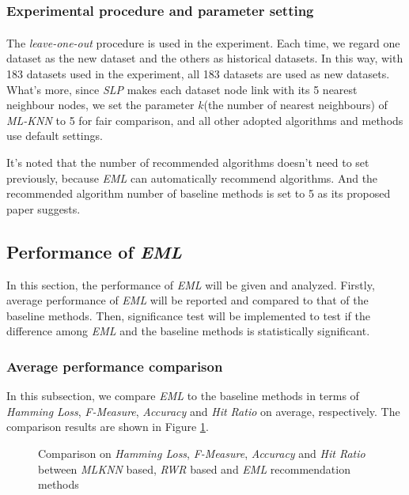 \documentclass[review,3p,twocolumn,times]{elsarticle}
\newcommand{\upcite}[1]{\textsuperscript{\cite{#1}}}
\begin{document}
\subsubsection{Experimental procedure and parameter setting}

The \emph{leave-one-out}\upcite{Kearns1997Algorithmic} procedure is used in the experiment. Each time, we regard one dataset as the new dataset and the others as historical datasets. In this way, with 183 datasets used in the experiment, all 183 datasets are used as new datasets. What's more, since \emph{SLP} makes each dataset node link with its 5 nearest neighbour nodes, we set the parameter $k$(the number of nearest neighbours) of \emph{ML-KNN} to 5 for fair comparison, and all other adopted algorithms and methods use default settings.

It's noted that the number of recommended algorithms doesn't need to set previously, because \emph{EML} can automatically recommend algorithms. And the recommended algorithm number of baseline methods is set to 5 as its proposed paper suggests.

\subsection{Performance of \emph{EML}}
\label{experiment result}

In this section, the performance of \emph{EML} will be given and analyzed. Firstly, average performance of \emph{EML} will be reported and compared to that of the baseline methods. Then, significance test will be implemented to test if the difference among \emph{EML} and the baseline methods is statistically significant.

\subsubsection{Average performance comparison}
\label{first comparison}

In this subsection, we compare \emph{EML} to the baseline methods in terms of \emph{Hamming Loss}, \emph{F-Measure}, \emph{Accuracy} and \emph{Hit Ratio} on average, respectively. The comparison results are shown in Figure \ref{fig:slp_emlknn}. 


\begin{figure}[!h]\small
	\centering
	\caption{Comparison on \emph{Hamming Loss}, \emph{F-Measure}, \emph{Accuracy} and \emph{Hit Ratio} between \emph{MLKNN} based, \emph{RWR} based and \emph{EML} recommendation methods}
	\label{fig:slp_emlknn}
\end{figure}
\end{document}
